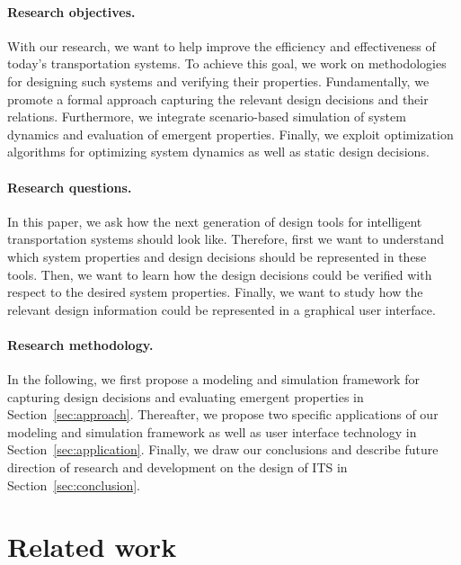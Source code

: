\documentclass[a4paper,twoside]{article}
\begin{document}
	\paragraph{Research objectives.}
	
	With our research, we want to help improve the efficiency and effectiveness of today's transportation systems.
	To achieve this goal, we work on methodologies for designing such systems and verifying their properties.
	Fundamentally, we promote a formal approach capturing the relevant design decisions and their relations.
	Furthermore, we integrate scenario-based simulation of system dynamics and evaluation of emergent properties.
	Finally, we exploit optimization algorithms for optimizing system dynamics as well as static design decisions.
	
	\paragraph{Research questions.}
	
	In this paper, we ask how the next generation of design tools for intelligent transportation systems should look like.
	Therefore, first we want to understand which system properties and design decisions should be represented in these tools.
	Then, we want to learn how the design decisions could be verified with respect to the desired system properties.
	Finally, we want to study how the relevant design information could be represented in a graphical user interface.
	
	\paragraph{Research methodology.}
	
	In the following, we first propose a modeling and simulation framework for capturing design decisions and evaluating emergent properties in Section~\ref{sec:approach}.
	Thereafter, we propose two specific applications of our modeling and simulation framework as well as user interface technology in Section~\ref{sec:application}.
	Finally, we draw our conclusions and describe future direction of research and development on the design of ITS in Section~\ref{sec:conclusion}. 
	
	\section{Related work}
\end{document}
